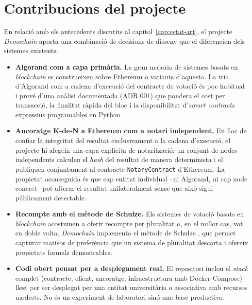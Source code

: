 \section{Contribucions del projecte}
\label{sec:contribucions}

En relació amb els antecedents discutits al capítol~\ref{cap:estat-art},
el projecte \emph{Demochain} aporta una combinació de decisions de
disseny que el diferencien dels sistemes existents:

\begin{itemize}
    \item \textbf{Algorand com a capa primària.} La gran majoria de
    sistemes basats en \emph{blockchain} es construeixen sobre Ethereum
    o variants d'aquesta. La tria d'Algorand com a cadena d'execució del
    contracte de votació és poc habitual i prové d'una anàlisi
    documentada (\ac{ADR} 001) que pondera el cost per transacció, la
    finalitat ràpida del bloc i la disponibilitat d'\emph{smart contracts}
    expressius programables en Python.

    \item \textbf{Ancoratge K-de-N a Ethereum com a notari independent.}
    En lloc de confiar la integritat del resultat exclusivament a la
    cadena d'execució, el projecte hi afegeix una capa explícita de
    notarització: un conjunt de nodes independents calculen el
    \emph{hash} del resultat de manera determinista i el publiquen
    conjuntament al contracte \texttt{NotaryContract} d'Ethereum. La
    propietat aconseguida és que cap entitat individual --ni Algorand,
    ni cap node concret-- pot alterar el resultat unilateralment sense
    que això sigui públicament detectable.

    \item \textbf{Recompte amb el mètode de Schulze.} Els sistemes de
    votació basats en \emph{blockchain} acostumen a oferir recompte per
    pluralitat o, en el millor cas, vot en doble volta. \emph{Demochain}
    implementa el mètode de Schulze \cite{schulze2011newmethod}, que
    permet capturar matisos de preferència que un sistema de
    pluralitat descarta i ofereix propietats formals demostrables.

    \item \textbf{Codi obert pensat per a desplegament real.} El
    repositori inclou el \emph{stack} complet (contracte, client,
    ancoratge, infraestructura amb Docker Compose) llest per ser
    desplegat per una entitat universitària o associativa amb recursos
    modests. No és un experiment de laboratori sinó una base
    productiva.
\end{itemize}

